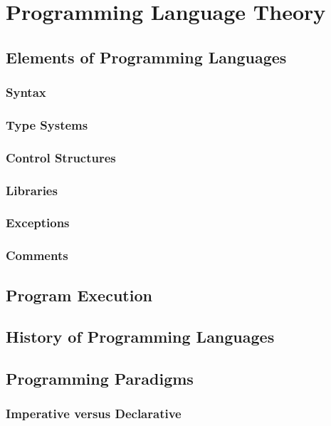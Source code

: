 \chapter{Programming Language Theory}

\section{Elements of Programming Languages}

\subsection{Syntax}

\subsection{Type Systems}

\subsection{Control Structures}

\subsection{Libraries}

\subsection{Exceptions}

\subsection{Comments}

\section{Program Execution}

\section{History of Programming Languages}

\section{Programming Paradigms}

\subsection{Imperative versus Declarative}

